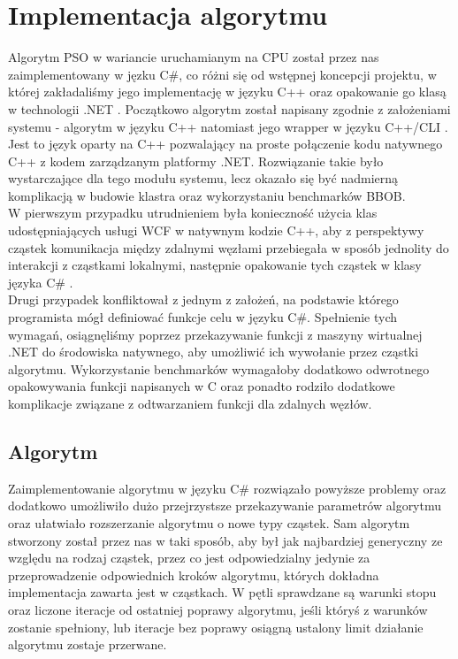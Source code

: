 \documentclass[12pt, twoside, openany, abstract=on]{report}
\theoremstyle{definition}
\begin{document}
\section{Implementacja algorytmu}
Algorytm PSO w wariancie uruchamianym na CPU został przez nas zaimplementowany w jęzku C\#, co różni się od wstępnej koncepcji projektu, w której zakładaliśmy jego implementację w języku C++ oraz opakowanie go klasą w technologii .NET . Początkowo algorytm został napisany zgodnie z założeniami systemu - algorytm w języku C++ natomiast jego wrapper w języku C++/CLI \cite{cppcli}. Jest to język oparty na C++ pozwalający na proste połączenie kodu natywnego C++ z kodem zarządzanym platformy .NET. Rozwiązanie takie było wystarczające dla tego modułu systemu, lecz okazało się być nadmierną komplikacją w budowie klastra oraz wykorzystaniu benchmarków BBOB.\\
W pierwszym przypadku utrudnieniem była konieczność użycia klas udostępniających usługi WCF w natywnym kodzie C++, aby  z perspektywy cząstek komunikacja między zdalnymi węzłami przebiegała w sposób jednolity do interakcji z cząstkami lokalnymi, następnie opakowanie tych cząstek w klasy języka C\# .\\
Drugi przypadek konfliktował z jednym z założeń, na podstawie którego programista mógł definiować funkcje celu w języku C\#. Spełnienie tych wymagań, osiągnęliśmy poprzez przekazywanie funkcji z maszyny wirtualnej .NET do środowiska natywnego, aby umożliwić ich wywołanie przez cząstki algorytmu. Wykorzystanie benchmarków wymagałoby dodatkowo odwrotnego opakowywania funkcji napisanych w C oraz ponadto rodziło dodatkowe komplikacje związane z odtwarzaniem funkcji dla zdalnych węzłów.

\subsection{Algorytm}
Zaimplementowanie algorytmu w języku C\# rozwiązało powyższe problemy oraz dodatkowo umożliwiło dużo przejrzystsze przekazywanie parametrów algorytmu oraz ułatwiało rozszerzanie algorytmu o nowe typy cząstek.
Sam algorytm stworzony został przez nas w taki sposób, aby był jak najbardziej generyczny ze względu na rodzaj cząstek, przez co jest odpowiedzialny jedynie za przeprowadzenie odpowiednich kroków algorytmu, których dokładna implementacja zawarta jest w cząstkach. W pętli sprawdzane są warunki stopu oraz liczone iteracje od ostatniej poprawy algorytmu, jeśli któryś z warunków zostanie spełniony, lub iteracje bez poprawy osiągną ustalony limit działanie algorytmu zostaje przerwane.
\end{document}
